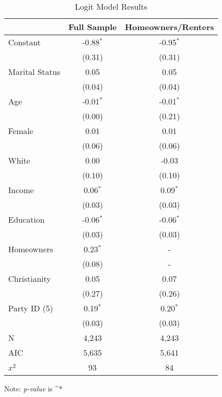 \documentclass[document]{cup-journal}
\begin{document}
 

\begin{table}[H]
\centering
\caption{Logit Model Results}
\label{Table 2}
\begin{tabular}{l | c | c}
            & Full Sample & Homeowners/Renters \\
			\hline
			Constant & -0.88$^{*}$ & -0.95$^{*}$ \\
			& (0.31) & (0.31) \\ 
			Marital Status & 0.05 & 0.05  \\ 
			& (0.04) & (0.04) \\ 
			Age & -0.01$^{*}$ & -0.01$^{*}$ \\
			& (0.00) & (0.21) \\ 
			Female & 0.01 & 0.01 \\
			& (0.06) & (0.06) \\ 
			White & 0.00 & -0.03  \\
			& (0.10) & (0.10) \\ 
			Income & 0.06$^{*}$ & 0.09$^{*}$ \\ 
			& (0.03) & (0.03) \\ 
            Education & -0.06$^{*}$ & -0.06$^{*}$ \\ 
			& (0.03) & (0.03) \\ 
            Homeowners & 0.23$^{*}$  & -  \\ 
			& (0.08)  &  - \\ 
            Christianity & 0.05 & 0.07   \\ 
			& (0.27)  & (0.26)\\ 
            Party ID (5) & 0.19$^{*}$ & 0.20$^{*}$  \\ 
			& (0.03) & (0.03)\\ 
			\hline
			N & 4,243 & 4,243 \\
			AIC & 5,635 & 5,641  \\
		  $x^2$ & 93 & 84 \\ 
                \end{tabular}
                \begin{tablenotes}[hang]
                \item[] Note: \emph{p-value} is  ^{*} 
                \end{tablenotes}
\end{table}
\end{document}
